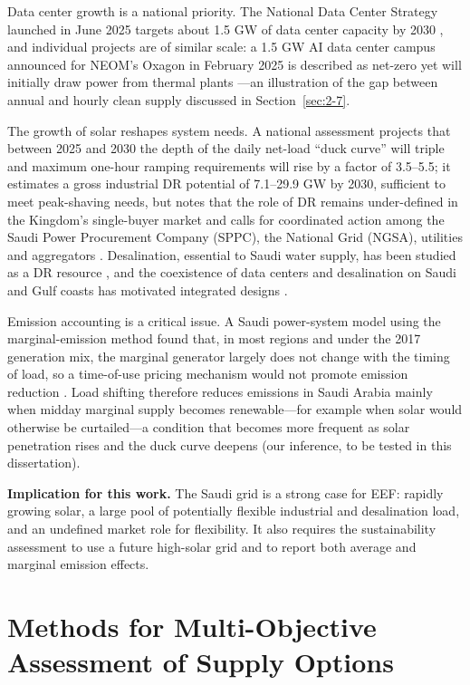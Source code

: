 Data center growth is a national priority. The National Data Center Strategy launched in June 2025 targets about 1.5 GW of data center capacity by 2030 \cite{r52}, and individual projects are of similar scale: a 1.5 GW AI data center campus announced for NEOM's Oxagon in February 2025 is described as net-zero yet will initially draw power from thermal plants \cite{r53}---an illustration of the gap between annual and hourly clean supply discussed in Section~\ref{sec:2-7}.

The growth of solar reshapes system needs. A national assessment projects that between 2025 and 2030 the depth of the daily net-load ``duck curve'' will triple and maximum one-hour ramping requirements will rise by a factor of 3.5--5.5; it estimates a gross industrial DR potential of 7.1--29.9 GW by 2030, sufficient to meet peak-shaving needs, but notes that the role of DR remains under-defined in the Kingdom's single-buyer market and calls for coordinated action among the Saudi Power Procurement Company (SPPC), the National Grid (NGSA), utilities and aggregators \cite{r23}. Desalination, essential to Saudi water supply, has been studied as a DR resource \cite{r19,r20}, and the coexistence of data centers and desalination on Saudi and Gulf coasts has motivated integrated designs \cite{r22}.

Emission accounting is a critical issue. A Saudi power-system model using the marginal-emission method found that, in most regions and under the 2017 generation mix, the marginal generator largely does not change with the timing of load, so a time-of-use pricing mechanism would not promote emission reduction \cite{r38}. Load shifting therefore reduces emissions in Saudi Arabia mainly when midday marginal supply becomes renewable---for example when solar would otherwise be curtailed---a condition that becomes more frequent as solar penetration rises and the duck curve deepens \cite{r23} (our inference, to be tested in this dissertation).

\textbf{Implication for this work.} The Saudi grid is a strong case for EEF: rapidly growing solar, a large pool of potentially flexible industrial and desalination load, and an undefined market role for flexibility. It also requires the sustainability assessment to use a future high-solar grid and to report both average and marginal emission effects.

\section{Methods for Multi-Objective Assessment of Supply Options}\label{sec:2-11}

